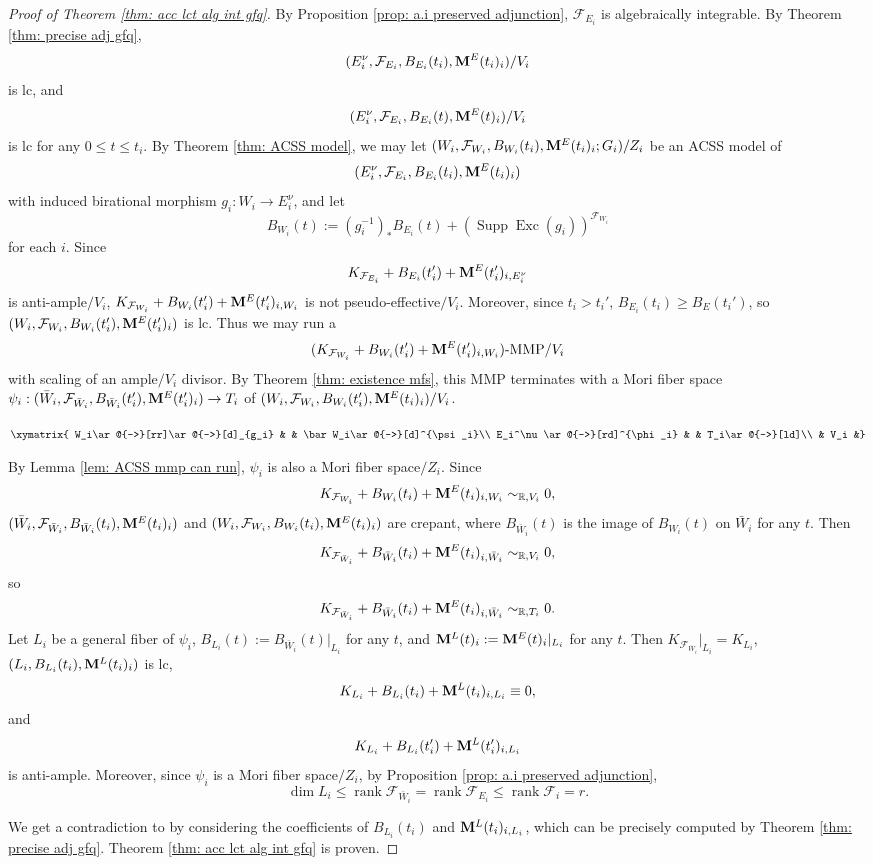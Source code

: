 \documentclass[11pt]{amsart}
\numberwithin{equation}{section}
\newcommand{\Mm}{{\bf{M}}}
\newcommand{\Exc}{\operatorname{Exc}}
\newcommand{\rk}{\operatorname{rank}}
\newcommand{\Supp}{\operatorname{Supp}}
\newcommand{\Ff}{\mathcal{F}}
\theoremstyle{definition}
\theoremstyle{definition}
\theoremstyle{definition}
\begin{document}
\begin{proof}[Proof of Theorem \ref{thm: acc lct alg int gfq}]
By Proposition \ref{prop: a.i preserved adjunction}, $\Ff_{E_i}$ is algebraically integrable. By Theorem \ref{thm: precise adj gfq}, 
$$(E_i^\nu,\Ff_{E_i},B_{E_i}(t_i),\Mm^E(t_i)_i)/V_i$$
is lc, and
$$(E_i^\nu,\Ff_{E_i},B_{E_i}(t),\Mm^E(t)_i)/V_i$$
is lc for any $0\leq t\leq t_i$. By Theorem \ref{thm:  ACSS model}, we may let 
$(W_i,\Ff_{W_i},B_{W_i}(t_i),\Mm^E(t_i)_i;G_i)/Z_i$
be an ACSS model of 
$$(E_i^\nu,\Ff_{E_i},B_{E_i}(t_i),\Mm^E(t_i)_i)$$ with induced birational morphism $g_i: W_i\rightarrow E_i^\nu$, and let 
$$B_{W_i}(t):=(g_i^{-1})_*B_{E_i}(t)+(\Supp\Exc(g_i))^{\Ff_{W_i}}$$
for each $i$. Since $$K_{\Ff_{E_i}}+B_{E_i}(t_i')+\Mm^E(t_i')_{i,E_i^\nu}$$
is anti-ample$/V_i$,
$K_{\Ff_{W_i}}+B_{W_i}(t_i')+\Mm^E(t_i')_{i,W_i}$ is not pseudo-effective$/V_i$. Moreover, since $t_i>t_i'$, $B_{E_i}(t_i)\geq B_E(t_i')$, so $(W_i,\Ff_{W_i},B_{W_i}(t_i'),\Mm^E(t_i')_i)$ is lc. Thus we may run a 
$$(K_{\Ff_{W_i}}+B_{W_i}(t_i')+\Mm^E(t_i')_{i,W_i})\text{-MMP}/V_i$$
with scaling of an ample$/V_i$ divisor. By Theorem \ref{thm: existence mfs}, this MMP terminates with a Mori fiber space $\psi_i: (\bar W_i,\Ff_{\bar W_i},B_{\bar W_i}(t_i'),\Mm^E(t_i')_{i})\rightarrow T_i$ of $(W_i,\Ff_{W_i},B_{W_i}(t_i'),\Mm^E(t_i)_i)/V_i$. 
\begin{center}$\xymatrix{
W_i\ar@{-->}[rr]\ar@{->}[d]_{g_i} &  & \bar W_i\ar@{->}[d]^{\psi_i}\\
E_i^\nu\ar@{->}[rd]^{\phi_i} & & T_i\ar@{->}[ld]\\
& V_i &}$
\end{center}
By Lemma \ref{lem: ACSS mmp can run}, $\psi_i$ is also a Mori fiber space$/Z_i$. Since 
$$K_{\Ff_{W_i}}+B_{W_i}(t_i)+\Mm^E(t_i)_{i,W_i}\sim_{\mathbb R,V_i}0,$$
$(\bar W_i,\Ff_{\bar W_i},B_{\bar W_i}(t_i),\Mm^E(t_i)_{i})$ and $(W_i,\Ff_{W_i},B_{W_i}(t_i),\Mm^E(t_i)_i)$ are crepant, where $B_{\bar W_i}(t)$ is the image of $B_{W_i}(t)$ on $\bar W_i$ for any $t$. Then
$$K_{\Ff_{\bar W_i}}+B_{\bar W_i}(t_i)+\Mm^E(t_i)_{i,\bar W_i}\sim_{\mathbb R,V_i}0,$$
so
$$K_{\Ff_{\bar W_i}}+B_{\bar W_i}(t_i)+\Mm^E(t_i)_{i,\bar W_i}\sim_{\mathbb R,T_i}0.$$
Let $L_i$ be a general fiber of $\psi_i$, $B_{L_i}(t):=B_{\bar W_i}(t)|_{L_i}$ for any $t$, and $\Mm^L(t)_i:=\Mm^E(t)_i|_{L_i}$ for any $t$. Then $K_{\Ff_{\bar W_i}}|_{L_i}=K_{L_i}$, $(L_i,B_{L_i}(t_i),\Mm^L(t_i)_i)$ is lc,
$$K_{L_i}+B_{L_i}(t_i)+\Mm^L(t_i)_{i,L_i}\equiv 0,$$
and
$$K_{L_i}+B_{L_i}(t_i')+\Mm^L(t_i')_{i,L_i}$$
is anti-ample. Moreover, since $\psi_i$ is a Mori fiber space$/Z_i$, by Proposition \ref{prop: a.i preserved adjunction}, 
$$\dim L_i\leq\rk\Ff_{\bar W_i}=\rk\Ff_{E_i}\leq\rk\Ff_i=r.$$




We get a contradiction to \cite[Theorem 1.6]{BZ16} by considering the coefficients of $B_{L_i}(t_i)$ and $\Mm^L(t_i)_{i,L_i}$, which can be precisely computed by Theorem \ref{thm: precise adj gfq}. Theorem \ref{thm: acc lct alg int gfq} is proven.
\end{proof}
\end{document}
